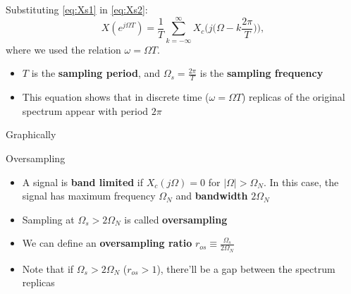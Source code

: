 \documentclass[10pt]{beamer}
\newcommand\PlotSampledSpectrum[4]{%
	\def\fs{#2}%
	\def\fmax{#3}%
	\def\ros{#4}%
}
\begin{document}
%
\begin{frame}
Substituting \eqref{eq:Xs1} in \eqref{eq:Xs2}:
\begin{equation*}
X(e^{j\Omega T}) = \frac{1}{T}\sum_{k=-\infty}^{\infty} X_c\Big(j\Big(\Omega - k\frac{2\pi}{T}\Big)\Big),
\end{equation*}
where we used the relation $\omega = \Omega T$.

\begin{itemize}
	\item $T$ is the \textbf{sampling period}, and $\Omega_s = \frac{2\pi}{T}$ is the \textbf{sampling frequency}
	\item This equation shows that in discrete time ($\omega = \Omega T$) replicas of the original spectrum appear with period $2\pi$
\end{itemize}

\end{frame}

\begin{frame}{Graphically}
\vspace{-0.4cm}
\begin{center}
	\resizebox{0.85\linewidth}{!}{}
\end{center}
\vspace{-0.4cm}
\end{frame}

\begin{frame}{Oversampling}
\begin{itemize}
	\item A signal is \textbf{band limited} if $X_c(j\Omega) = 0$ for $|\Omega| > \Omega_N$. In this case, the signal has maximum frequency $\Omega_N$ and \textbf{bandwidth} $2\Omega_N$
	\item Sampling at $\Omega_s > 2\Omega_N$ is called \textbf{oversampling}
	\item We can define an \textbf{oversampling ratio} $r_{os}\equiv \frac{\Omega_s}{2\Omega_N}$
	\item Note that if $\Omega_s > 2\Omega_N$ ($r_{os} > 1$), there'll be a gap between the spectrum replicas
\end{itemize}

\begin{center}
	\resizebox{0.8\linewidth}{!}{\PlotSampledSpectrum{figs/oversampling_example.tex}{10.0}{5.0}{$\Omega_s > 2\Omega_N$}}
\end{center}
\end{frame}
\end{document}
